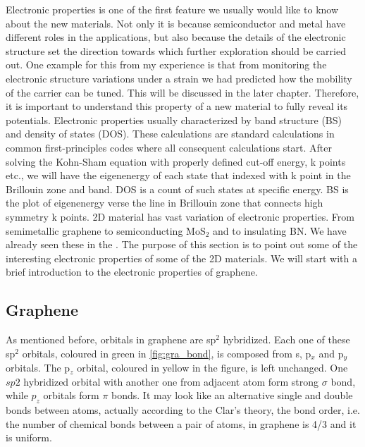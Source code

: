 Electronic properties is one of the first feature we usually would like to know about the new materials. Not only it is because semiconductor and metal have different roles in the applications, but also because the details of the electronic structure set the direction towards which further exploration should be carried out. One example for this from my experience is that from monitoring the electronic structure variations under a strain we had predicted how the mobility of the carrier can be tuned. This will be discussed in the later chapter. Therefore, it is important to understand this property of a new material to fully reveal its potentials. Electronic properties usually characterized by band structure (BS) and density of states (DOS). These calculations are standard calculations in common first-principles codes where all consequent calculations start. After solving the Kohn-Sham equation with properly defined cut-off energy, k points etc., we will have the eigenenergy of each state that indexed with k point in the Brillouin zone and band.  DOS is a count of such states at specific energy. BS is the plot of eigenenergy verse the line in Brillouin zone that connects high symmetry k points.  2D material has vast variation of electronic properties. From semimetallic graphene to semiconducting MoS$_2$ and to insulating BN. We have already seen these in the . The purpose of this section is to point out some of the interesting electronic properties of some of the 2D materials. We will start with a brief introduction to the electronic properties of graphene.

\subsection{Graphene}

As mentioned before, orbitals in graphene are sp$^2$ hybridized. Each one of these sp$^2$ orbitals, coloured in green in \autoref{fig:gra_bond}, is composed from s, p$_x$ and p$_y$ orbitals. The p$_z$ orbital, coloured in yellow in the figure, is left unchanged. One $sp2$ hybridized orbital with another one from adjacent atom form strong $\sigma$ bond, while $p_z$ orbitals form $\pi$ bonds. It may look like an alternative single and double bonds between atoms, actually according to the Clar's theory, the bond order, i.e. the number of chemical bonds between a pair of atoms, in graphene is 4/3 and it is uniform\cite{Wassmann2010}.


